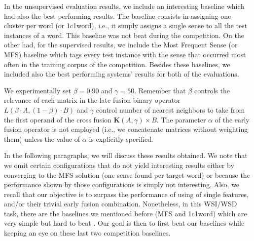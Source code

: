 In the unsupervised evaluation results, we include an interesting baseline which had also the best performing results. The baseline consists in assigning one cluster per word (or {1c1word}), i.e., it simply assigns a single sense to all the test instances of a word. This baseline was not beat during the competition. On the other had, for the supervised results, we include the Most Frequent Sense (or MFS) baseline which tags every test instance with the sense that occurred most often in the training corpus of the competition. Besides these baselines, we included also the best performing systems' results for both of the evaluations.


We experimentally set $\beta=0.90$ and $\gamma=50$. Remember that $\beta$ controls the relevance of each matrix in the late fusion binary operator $L(\beta\cdot A, (1-\beta)\cdot B)$ and $\gamma$ control number of nearest neighbors to take from the first operand of the cross fusion $\mathbf{K}(A,\gamma) \times B$. The parameter $\alpha$ of the early fusion operator is not employed (i.e., we concatenate matrices without weighting them) unless the value of $\alpha$ is explicitly specified.


In the following paragraphs, we will discuss these results obtained. We note that we omit certain configurations that do not yield interesting results either by converging to the MFS solution (one sense found per target word) or because the performance shown by those  configurations is simply not interesting. Also, we recall that our objective is to surpass the performance of using of single features, and/or their trivial early fusion combination. Nonetheless, in this WSI/WSD task, there are the baselines we mentioned before (MFS and 1c1word) which are very simple but hard to beat \cite{Agirre2007}. Our goal is then to first beat our baselines while keeping an eye on these last two competition baselines.

